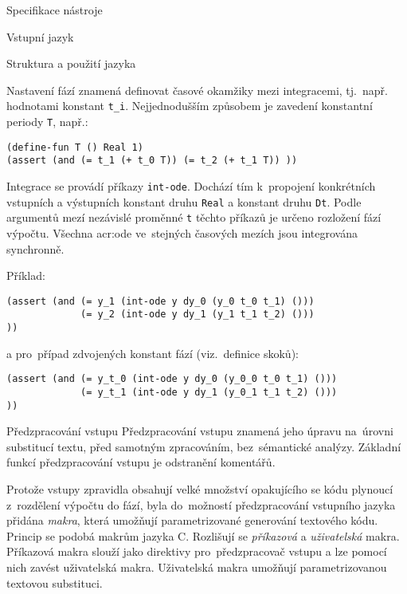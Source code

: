 \documentclass[thesis=M,czech]{FITthesis}[2012/06/26]
\newcommand{\acrlabel}[1]{acr:#1}
\newcommand{\acr}[1]{\acrshort{\acrlabel{#1}}}
\newcommand{\id}[1]{\texttt{#1}}
\newcommand{\hl}[1]{\textit{#1}}
\newcommand{\name}[1]{\hl{#1}}
\begin{document}
\begin{section}{Specifikace nástroje}
\begin{subsection}{Vstupní jazyk}
\begin{subsubsection}{Struktura a použití jazyka}

\begin{paragraph}{Nastavení fází}\label{p:design:spec:ilang:struct:step}
znamená definovat časové okamžiky mezi integracemi,
tj.~např. hodnotami konstant \id{t\_\-i}.
Nejjednodušším způsobem je zavedení
konstantní periody \id{T}, např.:
\begin{Verbatim}[samepage=true]
(define-fun T () Real 1)
(assert (and (= t_1 (+ t_0 T)) (= t_2 (+ t_1 T)) ))
\end{Verbatim}
\end{paragraph} %


\begin{paragraph}{Integrace}\label{p:design:spec:ilang:struct:int}
se provádí příkazy \id{int\--ode}.
Dochází tím k~propojení konkrétních vstupních a výstupních konstant
druhu \id{Real} a konstant druhu \id{Dt}.
Podle argumentů mezí nezávislé proměnné \id{t}
těchto příkazů je určeno rozložení fází výpočtu.
Všechna \acr{ode} ve~stejných časových mezích jsou
integrována synchronně.

Příklad:
\begin{Verbatim}[samepage=true]
(assert (and (= y_1 (int-ode y dy_0 (y_0 t_0 t_1) ()))
             (= y_2 (int-ode y dy_1 (y_1 t_1 t_2) ()))
))
\end{Verbatim}
a pro~případ zdvojených konstant fází (viz.~definice skoků):
\begin{Verbatim}[samepage=true]
(assert (and (= y_t_0 (int-ode y dy_0 (y_0_0 t_0 t_1) ()))
             (= y_t_1 (int-ode y dy_1 (y_0_1 t_1 t_2) ()))
))
\end{Verbatim}
\end{paragraph} %


\end{subsubsection} %


\begin{subsubsection}{Předzpracování vstupu}
\label{sss:design:spec:ilang:macros}
Předzpracování vstupu znamená jeho úpravu
na~úrovni substitucí textu,
před samotným zpracováním,
bez~sémantické analýzy.
Základní funkcí předzpracování vstupu je odstranění komentářů.

Protože vstupy zpravidla obsahují velké množství opakujícího se kódu
plynoucí z~rozdělení výpočtu do fází,
byla do~možností předzpracování vstupního jazyka přidána \name{makra},
která umožňují parametrizované generování textového kódu.
Princip se podobá makrům jazyka C.
Rozlišují se \hl{příkazová} a \hl{uživatelská} makra.
Příkazová makra slouží jako direktivy pro~předzpracovač vstupu
a lze pomocí nich zavést uživatelská makra.
Uživatelská makra umožňují parametrizovanou textovou substituci.


\end{subsubsection}
\end{subsection}
\end{section}
\end{document}
